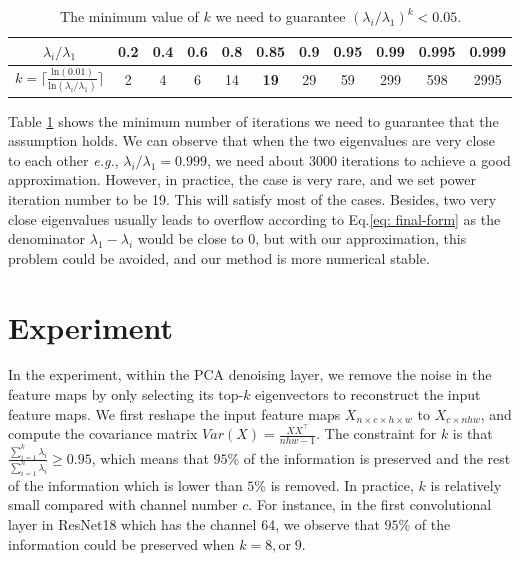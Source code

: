 \documentclass{article}
\begin{document}
\begin{table}[!htb]
\begin{center}
\begin{tabular}{ccccccccccc}
\hline
$\lambda_i/\lambda_1$ & 0.2 & 0.4 & 0.6 & 0.8 & \textbf{0.85} & 0.9 & 0.95 & 0.99 & 0.995 & 0.999 \\ \hline
$k = \lceil \frac{\text{ln}(0.01)}{\text{ln}(\lambda_i/\lambda_1)} \rceil $     & 2   & 4   & 6   & 14  & \textbf{19}   & 29  & 59   & 299  & 598   & 2995  \\ \hline
\end{tabular}
\caption{The minimum value of $k$ we need to guarantee $(\lambda_i/\lambda_1)^k<0.05$.}
\label{tab: kmin}
\end{center}
\end{table}

Table \ref{tab: kmin} shows the minimum number of iterations we need to guarantee that the assumption holds. We can observe that when the two eigenvalues are very close to each other \emph{e.g.}, $\lambda_i/\lambda_1=0.999$, we need about 3000 iterations to achieve a good approximation. However, in practice, the case is very rare, and we set power iteration number to be 19. This will satisfy most of the cases. Besides, two very close eigenvalues usually leads to overflow according to Eq.\ref{eq: final-form} as the denominator $\lambda_1 - \lambda_i$ would be close to 0, but with our approximation, this problem could be avoided, and our method is more numerical stable.

\section{Experiment}

In the experiment, within the PCA denoising layer, we remove the noise in the feature maps by only selecting its top-$k$ eigenvectors to reconstruct the input feature maps.
We first reshape the input feature maps $X_{n {\times} c {\times} h {\times} w}$ to $X_{c {\times} nhw}$, and compute the covariance matrix $Var(X) =\frac{XX^{\top}}{nhw-1}$.
The constraint for $k$ is that $\frac{\sum_{i=1}^k\lambda_i}{\sum_{i=1}^n\lambda_i} \geq 0.95$, which means that $95\%$ of the information is preserved and the rest of the information which is lower than $5\%$ is removed. 
In practice, $k$ is relatively small compared with channel number $c$. For instance, in the first convolutional layer in ResNet18 which has the channel 64, we observe that $95\%$ of the information could be preserved when $k=8, \text{or} \; 9$.
\end{document}

